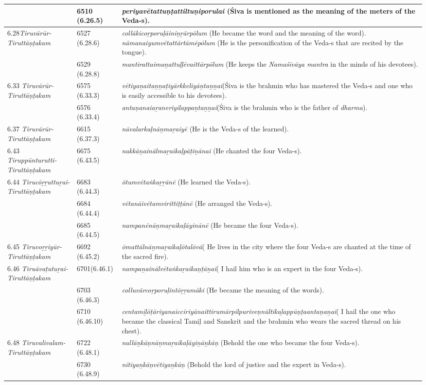 \begin{longtable}{|m{2.7cm}|m{2.7cm}|>{\raggedright}m{3cm}|}
\hline
 & 6510 (6.26.5) & \textit{periyavētattuṇṭattiltu\-ṇiporulai} (Śiva is mentioned  as the meaning of the meters of the Veda-s). \tabularnewline
\hline
6.28\textit{Tiruvārūr- Tiruttāṇṭakam} & 6527 (6.28.6) & \textit{collākicoṟporuḷāiniṉṟār\-pōlum} (He became the word and the meaning of the word). \textit{nāmanaiyumvētattārtāmēpōlum} (He is the personification of the Veda-s that are recited by the tongue). \tabularnewline
\hline
 & 6529 (6.28.8) & \textit{mantirattaimaṉattuḷḷē\-vaittārpōlum} (He keeps the \textit{Namaśivāya mantra} in the minds of his devotees). \tabularnewline
\hline
6.33 \textit{Tiruvārūr- Tiruttāṇṭakam} & 6575 (6.33.3) & \textit{vētiyaṉaitaṉṉaṭiyār\-kkeliyāṉtaṉṉai}(Śiva is the brahmin who has mastered the Veda-s and one who is easily accessible to his devotees). \tabularnewline
\hline
 & 6576 (6.33.4) & \textit{antaṇanaiaṟaneriyila\-ppaṉtaṉṉai}(Śiva is the brahmin who is the father of \textit{dharma}). \tabularnewline
\hline
6.37 \textit{Tiruvārūr- Tiruttāṇṭakam} & 6615 (6.37.3) & \textit{nāvalarkaḷnāṉmaṟaiyē} (He is the Veda-s of the learned). \tabularnewline
\hline
6.43 \textit{Tiruppūnturutti- Tiruttāṇṭakam} & 6675 (6.43.5) & \textit{nakkāṉainālmaṟaikaḷ\-pāṭiṉānai} (He chanted the four Veda-s). \tabularnewline
\hline
6.44 \textit{Tirucōṟṟuttuṟai- Tiruttāṇṭakam} & 6683 (6.44.3) & \textit{ōtumvētaṅkaṟṟānē} (He learned the Veda-s). \tabularnewline
\hline
 & 6684 (6.44.4) & \textit{vētanāivētamvirittiṭṭānē} (He arranged the Veda-s). \tabularnewline
\hline
 & 6685 (6.44.5) & \textit{nampanēnāṉmaṟaika\-ḷāyinānē} (He became the four Veda-s). \tabularnewline
\hline
6.45 \textit{Tiruvoṟṟiyūr- Tiruttāṇṭakam} & 6692 (6.45.2) & \textit{ōmattālnāṉmaṟaikaḷō\-talōvā}( He lives in the city where the four Veda-s are chanted at the time of the sacred fire). \tabularnewline
\hline
6.46 \textit{Tiruāvaṭutuṟai- Tiruttāṇṭakam} & 6701(6.46.1) & \textit{nampaṉainālvētaṅ\-kaṟaikaṇṭāṉai}( I hail him who is an expert in the four Veda-s). \tabularnewline
\hline
 & 6703 (6.46.3) & \textit{colluvārcoṟporuḷintōṟṟa\-māki }(He became the meaning of the words). \tabularnewline
\hline
 & 6710 (6.46.10) & \textit{centamiḻōṭāriyanaiccīri\-yānaittirumārpilpuri\-veṇnūltikaḻappūṇṭaan\-taṇaṉai}( I hail the one who became the  classical Tamiḻ and Sanskrit and the brahmin who wears the sacred thread on his chest). \tabularnewline
\hline
6.48 \textit{Tiruvalivalam- Tiruttāṇṭakam} & 6722 (6.48.1) & \textit{nallāṉkāṇnāṉmaṟai\-kaḷāyiṉāṉkāṇ} (Behold the one who became the four Veda-s). \tabularnewline
\hline
 & 6730 (6.48.9) & \textit{nītiyaṉkāṇvētiyaṉkāṇ} (Behold the lord of justice and the expert in Veda-s). \tabularnewline

\end{longtable}
